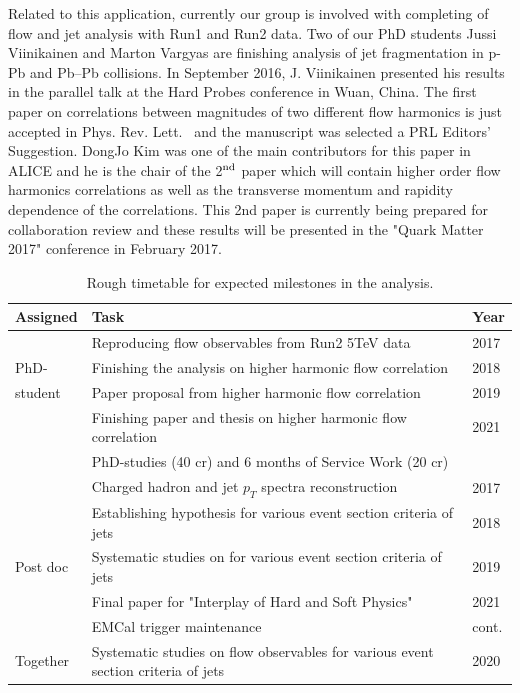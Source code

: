Related to this application, currently our group is involved with completing of flow and jet analysis with Run1 and Run2 data. Two of our PhD students Jussi Viinikainen and Marton Vargyas are finishing analysis of jet fragmentation in p-Pb and Pb--Pb collisions. In September 2016, J. Viinikainen  presented his results in the parallel talk at the Hard Probes conference in Wuan, China. The first paper on correlations between magnitudes of two different flow harmonics is just accepted in Phys. Rev. Lett.~\cite{ALICE:2016kpq} and the manuscript was selected a PRL Editors' Suggestion. DongJo Kim was one of the main contributors for this paper in ALICE and he is the chair of the 2$^{\rm nd}$ paper which will contain higher order flow harmonics correlations as well as the transverse momentum and rapidity dependence of the correlations. This 2nd paper is currently being prepared for collaboration review and these results will be presented in the "Quark Matter 2017" conference in February 2017. 

\begin{table}[htp]
\caption{Rough timetable for expected milestones in the analysis.}
\begin{center}
\begin{tabular}{ L{1.6cm} | L{11.5cm} | L{1.0cm} }
Assigned & Task & Year \\
\hline
 & Reproducing flow observables from Run2 5TeV data &  2017 \\
PhD-     & Finishing the analysis on higher harmonic flow correlation  & 2018\\
student & Paper proposal from higher harmonic flow correlation & 2019 \\
 & Finishing paper and thesis on higher harmonic flow correlation & 2021 \\
 & PhD-studies (40 cr) and 6 months of Service Work (20 cr) &  \\
\hline
 & Charged hadron and jet $p_{T}$ spectra reconstruction & 2017 \\
 & Establishing hypothesis for various event section criteria of jets  & 2018 \\
Post doc & Systematic studies on for various event section criteria of jets & 2019 \\
 & Final paper for "Interplay of Hard and Soft Physics"  & 2021 \\
 & EMCal trigger maintenance & cont. \\
\hline
 Together& Systematic studies on flow observables for various event section criteria of jets & 2020 \\
\hline
\end{tabular}
\end{center}
\label{tab:timetable}
\end{table}

